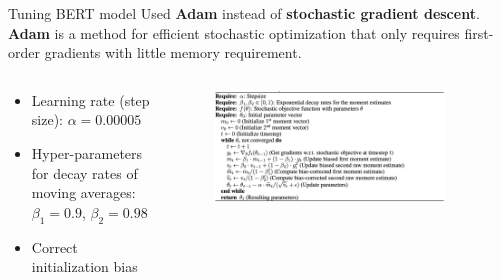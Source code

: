 \documentclass{beamer}
\begin{document}
\begin{frame}{Tuning BERT model}
  Used \textbf{Adam} instead of \textbf{stochastic gradient descent}. \textbf{Adam} is a method for efficient stochastic optimization that only requires first-order gradients with little memory requirement.\cite{kingma2017adam}
  \begin{columns}
    \begin{column}{0.3\textwidth}
      \begin{itemize}
        \item Learning rate (step size): $\alpha = 0.00005$
        \item Hyper-parameters for decay rates of moving averages: $\beta_1 = 0.9$, $\beta_2 = 0.98$
        \item Correct initialization bias
      \end{itemize}
    \end{column}
    \begin{column}{0.7\textwidth}
        \begin{figure}[ht!]
          \centering
          \includegraphics[width=0.9\textwidth]{images/adam_opt.png}
      \end{figure}     
    \end{column}
  \end{columns}
\end{frame}
\end{document}
